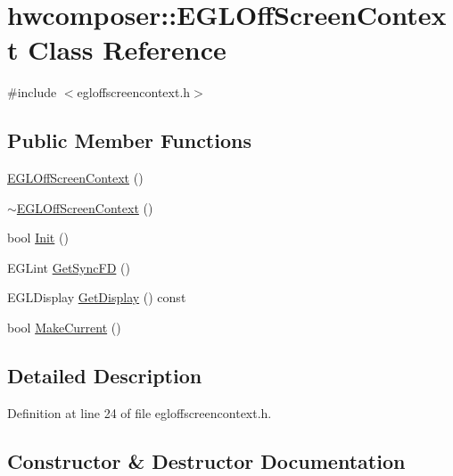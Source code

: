 \hypertarget{classhwcomposer_1_1EGLOffScreenContext}{}\section{hwcomposer\+:\+:E\+G\+L\+Off\+Screen\+Context Class Reference}
\label{classhwcomposer_1_1EGLOffScreenContext}


{\ttfamily \#include $<$egloffscreencontext.\+h$>$}

\subsection*{Public Member Functions}
\begin{DoxyCompactItemize}
\item 
\mbox{\hyperlink{classhwcomposer_1_1EGLOffScreenContext_ad90e8e959cbcfab300b9e240d39d8b26}{E\+G\+L\+Off\+Screen\+Context}} ()
\item 
\mbox{\hyperlink{classhwcomposer_1_1EGLOffScreenContext_ace13930052a6c2461e8143abbc89bb53}{$\sim$\+E\+G\+L\+Off\+Screen\+Context}} ()
\item 
bool \mbox{\hyperlink{classhwcomposer_1_1EGLOffScreenContext_a70b98f401e88080f13a6df4b2cc4c8e2}{Init}} ()
\item 
E\+G\+Lint \mbox{\hyperlink{classhwcomposer_1_1EGLOffScreenContext_a8f98b9bb56923114d3d4c6051968e543}{Get\+Sync\+FD}} ()
\item 
E\+G\+L\+Display \mbox{\hyperlink{classhwcomposer_1_1EGLOffScreenContext_a8fbaabaa0eb7d4c18143932d44d68ee2}{Get\+Display}} () const
\item 
bool \mbox{\hyperlink{classhwcomposer_1_1EGLOffScreenContext_a6a02ca4cb2ad6f22af3343ac473baf2a}{Make\+Current}} ()
\end{DoxyCompactItemize}


\subsection{Detailed Description}


Definition at line 24 of file egloffscreencontext.\+h.



\subsection{Constructor \& Destructor Documentation}
\mbox{\label{classhwcomposer_1_1EGLOffScreenContext_ad90e8e959cbcfab300b9e240d39d8b26}} 

